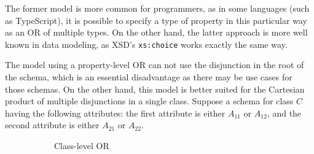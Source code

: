 The former model is more common for programmers, as in some languages (such as TypeScript), it is possible to specify a type of property in this particular way as an OR of multiple types. On the other hand, the latter approach is more well known in data modeling, as XSD's {\tt xs:choice} works exactly the same way.

The model using a property-level OR can not use the disjunction in the root of the schema, which is an essential disadvantage as there may be use cases for those schemas. On the other hand, this model is better suited for the Cartesian product of multiple disjunctions in a single class. Suppose a schema for class $C$ having the following attributes: the first attribute is either $A_{11}$ or $A_{12}$, and the second attribute is either $A_{21}$ or $A_{22}$.

\begin{figure}[h!]\centering
  \begin{subfigure}[b]{.6\textwidth}
    \centering
    \caption{Class-level OR}
    \end{subfigure}%
    \begin{subfigure}[b]{.4\textwidth}
    \centering
\end{subfigure}
\end{figure}
